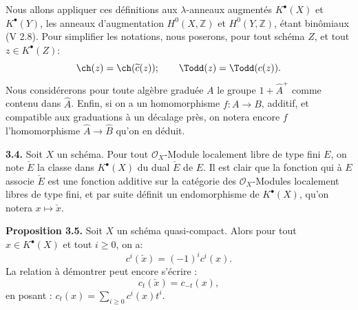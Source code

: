 Nous allons appliquer ces définitions aux $\lambda$-anneaux augmentés $K^{\bullet}(X)$ et $K^{\bullet}(Y)$, les anneaux d'augmentation $H^0(X,\mathbb Z)$ et $H^0(Y,\mathbb Z)$, étant binômiaux (V 2.8). Pour simplifier les notations, nous poserons, pour tout schéma $Z$, et tout $z\in K^{\bullet}(Z)$:
\[
\ch(z)=\ch(\widetilde c(z));
\qquad
\Todd(z)=\Todd(c(z)).
\]
Nous considérerons pour toute algèbre graduée $A$ le groupe $1+\widehat A^+$ comme contenu dans $\widehat A$. Enfin, si on a un homomorphisme $f:A\to B$, additif, et compatible aux graduations à un décalage près, on notera encore $f$ l'homomorphisme $\widehat A\to\widehat B$ qu'on en déduit.

\textbf{3.4.} Soit $X$ un schéma. Pour tout $\mathcal O_X$-Module localement libre de type fini $E$, on note $\check E$ la classe dans $K^{\bullet}(X)$ du dual $\check E$ de $E$. Il est clair que la fonction qui à $E$ associe $\check E$ est une fonction additive sur la catégorie des $\mathcal O_X$-Modules localement libres de type fini, et par suite définit un endomorphisme de $K^{\bullet}(X)$, qu'on notera $x\mapsto\check x$.

\textbf{Proposition 3.5.} Soit $X$ un schéma quasi-compact. Alors pour tout $x\in K^{\bullet}(X)$ et tout $i\geq0$, on a:
\[
c^i(\check x)=(-1)^i c^i(x).
\]
La relation à démontrer peut encore s'écrire :
\[
c_t(\check x)=c_{-t}(x),
\]
en posant : $c_t(x)=\sum_{i\geq0}c^i(x)t^i$.
